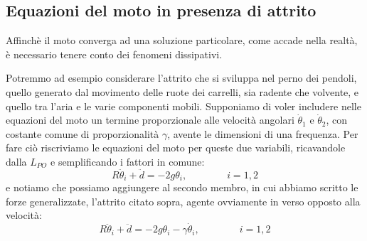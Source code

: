 \documentclass[11pt, a4paper, twoside]{article}
\begin{document}
\subsection{Equazioni del moto in presenza di attrito}
Affinchè il moto converga ad una soluzione particolare, come accade nella realtà, 
è necessario tenere conto dei fenomeni dissipativi.

Potremmo ad esempio considerare l'attrito che si sviluppa nel perno 
dei pendoli, quello generato dal movimento delle ruote dei
 carrelli, sia radente che volvente, e quello tra l'aria e le varie 
 componenti mobili.
Supponiamo di voler includere nelle equazioni del moto un termine 
proporzionale alle velocità angolari $\dot \theta_1$ e $\dot \theta_2$, con costante comune di 
proporzionalità $\gamma$, avente le dimensioni di una frequenza. 
Per fare ciò riscriviamo le equazioni del moto 
per queste due variabili, ricavandole dalla $L_{PO}$ e semplificando i fattori in comune:
\begin{equation}
    R \ddot \theta_i + \ddot d = - 2 g  \theta_i ,\qquad \qquad i =1,2
  \label{equazionemotonewton}
\end{equation}
e notiamo che possiamo aggiungere al secondo membro, in cui abbiamo scritto le 
forze generalizzate, l'attrito citato sopra, agente ovviamente in verso 
opposto alla velocità:
\begin{equation}
  R \ddot \theta_i + \ddot d = - 2 g \theta_i  - \gamma   \dot \theta_i,\qquad \qquad i =1,2
  \label{equazionidissipative}
\end{equation}
\end{document}
